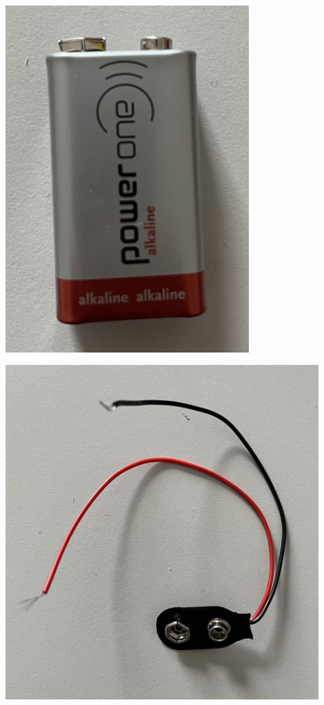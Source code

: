 \documentclass[a4paper, 12pt, diplomski]{etf}
\begin{document}
\begin{center}
\begin{minipage}{0.5\textwidth}
\centering
\includegraphics[width=0.7\textwidth]{real/baterija2.jpeg}
\label{baterija}
\end{minipage}%
\begin{minipage}{0.5\textwidth}
\centering
\includegraphics[width=0.9\textwidth]{real/konektor3.jpeg} 
\label{konektor} 
\end{minipage}
\end{center}
\end{document}
